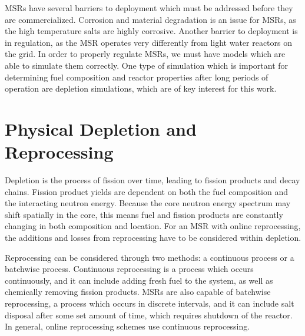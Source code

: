 MSRs have several barriers to deployment which must be addressed before they are commercialized. Corrosion and material degradation is an issue for MSRs, as the high temperature salts are highly corrosive. Another barrier to deployment is in regulation, as the MSR operates very differently from light water reactors on the grid.
In order to properly regulate MSRs, we must have models which are able to simulate them correctly. One type of simulation which is important for determining fuel composition and reactor properties after long periods of operation are depletion simulations, which are of key interest for this work.

\section{Physical Depletion and Reprocessing}


Depletion is the process of fission over time, leading to fission products and decay chains.
Fission product yields are dependent on both the fuel composition and the interacting neutron energy.
Because the core neutron energy spectrum may shift spatially in the core, this means fuel and fission products are constantly changing in both composition and location.
For an MSR with online reprocessing, the additions and losses from reprocessing have to be considered within depletion.

Reprocessing can be considered through two methods: a continuous process or a batchwise process.
Continuous reprocessing is a process which occurs continuously, and it can include adding fresh fuel to the system, as well as chemically removing fission products.
MSRs are also capable of batchwise reprocessing, a process which occurs in discrete intervals, and it can include salt disposal after some set amount of time, which requires shutdown of the reactor.
In general, online reprocessing schemes use continuous reprocessing.

